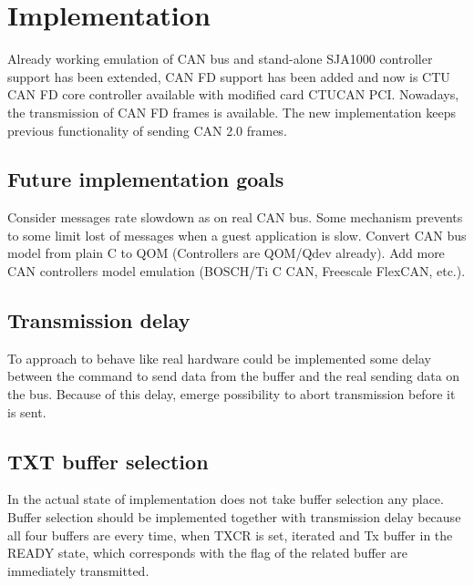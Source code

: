 \documentclass{ctuthesis}
\begin{document}
 \section{Implementation}
  Already working emulation of CAN bus and stand-alone SJA1000 controller support has been extended, CAN FD support has been added and now is CTU CAN FD core controller available with modified card CTUCAN PCI. Nowadays, the transmission of CAN FD frames is available. The new implementation keeps previous functionality of sending CAN 2.0 frames.

 \subsection{Future implementation goals}
  Consider messages rate slowdown as on real CAN bus. Some mechanism prevents to some limit lost of messages when a guest application is slow. Convert CAN bus model from plain C to QOM (Controllers are QOM/Qdev already). Add more CAN controllers model emulation (BOSCH/Ti C CAN, Freescale FlexCAN, etc.).
 
 \subsection{Transmission delay}
 To approach to behave like real hardware could be implemented some delay between the command to send data from the buffer and the real sending data on the bus. Because of this delay, emerge possibility to abort transmission before it is sent.
 
 \subsection{TXT buffer selection}
  In the actual state of implementation does not take buffer selection any place. Buffer selection should be implemented together with transmission delay because all four buffers are every time, when TXCR is set, iterated and Tx buffer in the READY state, which corresponds with the flag of the related buffer are immediately transmitted.
 
\end{document}
